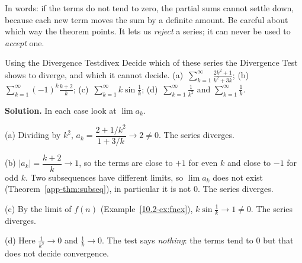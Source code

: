 \documentclass[11pt]{article}
\begin{document}
In words: if the terms do not tend to zero, the partial sums cannot settle down, because each new term moves the sum by a definite amount. Be careful about which way the theorem points. It lets us \emph{reject} a series; it can never be used to \emph{accept} one.

\begin{exmp}{Using the Divergence Test}{divex}
Decide which of these series the Divergence Test shows to diverge, and which it cannot decide. (a)~$\displaystyle\sum_{k=1}^\infty\frac{2k^2+1}{k^2+3k}$; \quad (b)~$\displaystyle\sum_{k=1}^\infty(-1)^k\frac{k+2}{k}$; \quad (c)~$\displaystyle\sum_{k=1}^\infty k\sin\frac1k$; \quad (d)~$\displaystyle\sum_{k=1}^\infty\frac1{k^2}$ and $\displaystyle\sum_{k=1}^\infty\frac1k$.

\textbf{Solution.} In each case look at $\lim a_k$.

(a) Dividing by $k^2$, $a_k=\dfrac{2+1/k^2}{1+3/k}\to2\ne0$. The series diverges.

(b) $|a_k|=\dfrac{k+2}k\to1$, so the terms are close to $+1$ for even $k$ and close to $-1$ for odd $k$. Two subsequences have different limits, so $\lim a_k$ does not exist (Theorem~\ref{app-thm:subseq}), in particular it is not $0$. The series diverges.

(c) By the limit of $f(n)$ (Example~\ref{10.2-ex:fnex}), $k\sin\frac1k\to1\ne0$. The series diverges.

(d) Here $\frac1{k^2}\to0$ and $\frac1k\to0$. The test says \emph{nothing}: the terms tend to $0$ but that does not decide convergence.
\end{exmp}
\end{document}
